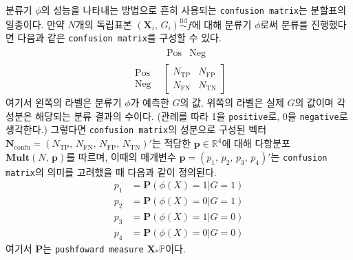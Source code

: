 \documentclass[11pt,onecolumn,twoside,a4size]{gsag3jnl}
\newcommand{\iid}{\stackrel{\mathrm{iid}}{\sim}}
\begin{document}
분류기 $\phi$의 성능을 나타내는 방법으로 흔히 사용되는 \texttt{confusion matrix}는 분할표의 일종이다. 만약 $N$개의 독립표본 $(\mathbf{X}_i,\,G_i)\iid f$에 대해 분류기 $\phi$로써 분류를 진행했다면 다음과 같은 \texttt{confusion matrix}를 구성할 수 있다.
\begin{equation}
  \begin{array}{cc}
      &\begin{array}{cc}
          \mathrm{Pos} & \mathrm{Neg}
      \end{array}\\
      \begin{array}{r}
          \mathrm{Pos}\\
          \mathrm{Neg}
      \end{array}&\left[\begin{array}{cc}
          N_\mathrm{TP} & N_\mathrm{FP}\\
          N_\mathrm{FN} & N_\mathrm{TN}
      \end{array}\right]
  \end{array}
\end{equation}
여기서 왼쪽의 라벨은 분류기 $\phi$가 예측한 $G$의 값, 위쪽의 라벨은 실제 $G$의 값이며 각 성분은 해당되는 분류 결과의 수이다. (관례를 따라 1을 \texttt{positive}로, 0을 \texttt{negative}로 생각한다.) 그렇다면 \texttt{confusion matrix}의 성분으로 구성된 벡터 $\mathbf{N}_\mathrm{confu}=(N_\mathrm{TP},\,N_\mathrm{FN},\,N_\mathrm{FP},\,N_\mathrm{TN})'$는 적당한 $\mathbf{p}\in\mathbb{R}^4$에 대해 다항분포 $\mathbf{Mult}(N,\,\mathbf{p})$를 따르며, 이때의 매개변수 $\mathbf{p}=(p_1,\,p_2,\,p_3,\,p_4)'$는 \texttt{confusion matrix}의 의미를 고려했을 때 다음과 같이 정의된다.
\begin{align}
  p_1&=\mathbf{P}(\phi(X)=1\vert G=1)\\
  p_2&=\mathbf{P}(\phi(X)=0\vert G=1)\nonumber\\
  p_3&=\mathbf{P}(\phi(X)=1\vert G=0)\nonumber\\
  p_4&=\mathbf{P}(\phi(X)=0\vert G=0)\nonumber
\end{align}
여기서 $\mathbf{P}$는 \texttt{pushfoward measure} $\mathbf{X}_*\mathbb{P}$이다.
\end{document}
